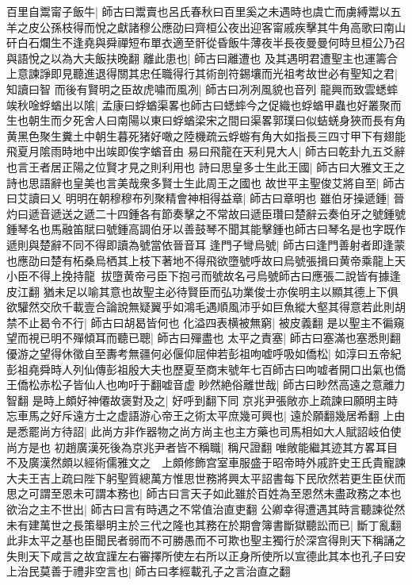 百里自鬻甯子飯牛|{
	師古曰鬻賣也呂氏春秋曰百里奚之未遇時也虞亡而虜縛鬻以五羊之皮公孫枝得而悅之獻諸穆公應劭曰齊桓公夜出迎客甯戚疾擊其牛角高歌曰南山矸白石爛生不逢堯與舜禪短布單衣適至骭從昏飯牛薄夜半長夜曼曼何時旦桓公乃召與語悅之以為大夫飯扶晚翻}
離此患也|{
	師古曰離遭也}
及其遇明君遭聖主也運籌合上意諫諍即見聽進退得關其忠任職得行其術剖符錫壤而光祖考故世必有聖知之君|{
	知讀曰智}
而後有賢明之臣故虎嘯而風冽|{
	師古曰冽冽風貌也音列}
龍興而致雲蟋蟀竢秋唫蜉蝤出以隂|{
	孟康曰蜉蝤渠畧也師古曰蟋蟀今之促織也蜉蝤甲蟲也好叢聚而生也朝生而夕死舍人曰南陽以東曰蜉蝤梁宋之間曰渠畧郭璞曰似蛣蜣身狹而長有角黄黑色聚生糞土中朝生暮死猪好噉之陸機疏云蜉蝣有角大如指長三四寸甲下有翅能飛夏月隂雨時地中出竢即俟字蝤音由}
易曰飛龍在天利見大人|{
	師古曰乾卦九五爻辭也言王者居正陽之位賢才見之則利用也}
詩曰思皇多士生此王國|{
	師古曰大雅文王之詩也思語辭也皇美也言美哉衆多賢士生此周王之國也}
故世平主聖俊艾將自至|{
	師古曰艾讀曰乂}
明明在朝穆穆布列聚精會神相得益章|{
	師古曰章明也}
雖伯牙操遞鍾|{
	晉灼曰遞音遞送之遞二十四鍾各有節奏擊之不常故曰遞臣瓚曰楚辭云奏伯牙之號鍾號鍾琴名也馬融笛賦曰號鍾高調伯牙以善鼓琴不聞其能擊鍾也師古曰琴名是也字既作遞則與楚辭不同不得即讀為號當依晉音耳}
逢門子彎烏號|{
	師古曰逢門善射者即逢蒙也應劭曰楚有柘桑烏栖其上枝下著地不得飛欲墮號呼故曰烏號張揖曰黄帝乘龍上天小臣不得上挽持龍拔墮黄帝弓臣下抱弓而號故名弓烏號師古曰應張二說皆有據逢皮江翻}
猶未足以喻其意也故聖主必待賢臣而弘功業俊士亦俟明主以顯其德上下俱欲驩然交欣千載壹合論說無疑翼乎如鴻毛遇順風沛乎如巨魚縱大壑其得意若此則胡禁不止曷令不行|{
	師古曰胡曷皆何也}
化溢四表横被無窮|{
	被皮義翻}
是以聖主不徧窺望而視已明不殫傾耳而聽已聰|{
	師古曰殫盡也}
太平之責塞|{
	師古曰塞滿也塞悉則翻}
優游之望得休徵自至夀考無疆何必偃仰屈伸若彭祖呴嘘呼吸如僑松|{
	如淳曰五帝紀彭祖堯舜時人列仙傳彭祖殷大夫也歷夏至商末號年七百師古曰呴嘘者開口出氣也僑王僑松赤松子皆仙人也呴吁于翻嘘音虚}
眇然絶俗離世哉|{
	師古曰眇然高遠之意離力智翻}
是時上頗好神僊故褒對及之|{
	好呼到翻下同}
京兆尹張敞亦上疏諫曰願明主時忘車馬之好斥遠方士之虚語游心帝王之術太平庶幾可興也|{
	遠於願翻幾居希翻}
上由是悉罷尚方待詔|{
	此尚方非作器物之尚方尚主也主方藥也司馬相如大人賦詔岐伯使尚方是也}
初趙廣漢死後為京兆尹者皆不稱職|{
	稱尺證翻}
唯敞能繼其迹其方畧耳目不及廣漢然頗以經術儒雅文之　上頗修飾宫室車服盛于昭帝時外戚許史王氏貴寵諫大夫王吉上疏曰陛下躬聖質總萬方惟思世務將興太平詔書每下民欣然若更生臣伏而思之可謂至恩未可謂本務也|{
	師古曰言天子如此雖於百姓為至恩然未盡政務之本也}
欲治之主不世出|{
	師古曰言有時遇之不常值治直吏翻}
公卿幸得遭遇其時言聽諫從然未有建萬世之長策舉明主於三代之隆也其務在於期會簿書斷獄聽訟而已|{
	斷丁亂翻}
此非太平之基也臣聞民者弱而不可勝愚而不可欺也聖主獨行於深宫得則天下稱誦之失則天下咸言之故宜謹左右審擇所使左右所以正身所使所以宣德此其本也孔子曰安上治民莫善于禮非空言也|{
	師古曰孝經載孔子之言治直之翻}
